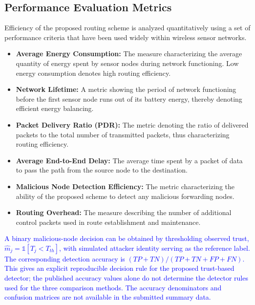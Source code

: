 \documentclass[pdflatex,sn-mathphys-num]{sn-jnl}
\newcommand{\Revised}[1]{\textcolor{blue}{#1}}
\begin{document}

\subsection{Performance Evaluation Metrics}

Efficiency of the proposed routing scheme is analyzed quantitatively using a set of performance criteria that have been used widely within wireless sensor networks.

\begin{itemize}

\item \textbf{Average Energy Consumption:}
The measure characterizing the average quantity of energy spent by sensor nodes during network functioning. Low energy consumption denotes high routing efficiency.

\item \textbf{Network Lifetime:}
A metric showing the period of network functioning before the first sensor node runs out of its battery energy, thereby denoting efficient energy balancing.

\item \textbf{Packet Delivery Ratio (PDR):}
The metric denoting the ratio of delivered packets to the total number of transmitted packets, thus characterizing routing efficiency.

\item \textbf{Average End-to-End Delay:}
The average time spent by a packet of data to pass the path from the source node to the destination.

\item \textbf{Malicious Node Detection Efficiency:}
The metric characterizing the ability of the proposed scheme to detect any malicious forwarding nodes.

\item \textbf{Routing Overhead:}
The measure describing the number of additional control packets used in route establishment and maintenance.

\end{itemize}


\Revised{A binary malicious-node decision can be obtained by thresholding observed trust, $\widehat m_j=\mathbb 1[T_j<T_{th}]$, with simulated attacker identity serving as the reference label. The corresponding detection accuracy is $(TP+TN)/(TP+TN+FP+FN)$. This gives an explicit reproducible decision rule for the proposed trust-based detector; the published accuracy values alone do not determine the detector rules used for the three comparison methods. The accuracy denominators and confusion matrices are not available in the submitted summary data.}
\end{document}

